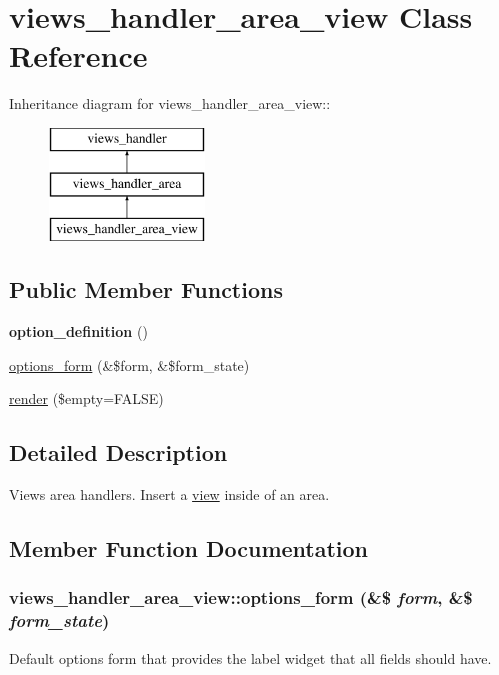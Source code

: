 \hypertarget{classviews__handler__area__view}{
\section{views\_\-handler\_\-area\_\-view Class Reference}
\label{classviews__handler__area__view}
}
Inheritance diagram for views\_\-handler\_\-area\_\-view::\begin{figure}[H]
\begin{center}
\leavevmode
\includegraphics[height=3cm]{classviews__handler__area__view}
\end{center}
\end{figure}
\subsection*{Public Member Functions}
\begin{DoxyCompactItemize}
\item 
\hypertarget{classviews__handler__area__view_a585b9ffdeb7e11a39c11eb12d0a5bc3c}{
{\bfseries option\_\-definition} ()}
\label{classviews__handler__area__view_a585b9ffdeb7e11a39c11eb12d0a5bc3c}

\item 
\hyperlink{classviews__handler__area__view_a6fd3e047a259d06d4fec77b0c286e9ed}{options\_\-form} (\&\$form, \&\$form\_\-state)
\item 
\hyperlink{classviews__handler__area__view_a475224309a7f09c2101477edf73541e5}{render} (\$empty=FALSE)
\end{DoxyCompactItemize}


\subsection{Detailed Description}
Views area handlers. Insert a \hyperlink{classview}{view} inside of an area. 

\subsection{Member Function Documentation}
\hypertarget{classviews__handler__area__view_a6fd3e047a259d06d4fec77b0c286e9ed}{
\subsubsection[{options\_\-form}]{\setlength{\rightskip}{0pt plus 5cm}views\_\-handler\_\-area\_\-view::options\_\-form (\&\$ {\em form}, \/  \&\$ {\em form\_\-state})}}
\label{classviews__handler__area__view_a6fd3e047a259d06d4fec77b0c286e9ed}
Default options form that provides the label widget that all fields should have. 

